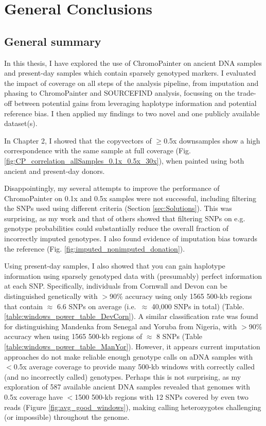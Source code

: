 \chapter{General Conclusions}
\label{chapterlabelConclusions}

\section{General summary}

In this thesis, I have explored the use of ChromoPainter on ancient DNA samples and present-day samples which contain sparsely genotyped markers. I evaluated the impact of coverage on all steps of the analysis pipeline, from imputation and phasing to ChromoPainter and SOURCEFIND analysis, focussing on the trade-off between potential gains from leveraging haplotype information and potential reference bias. I then applied my findings to two novel and one publicly available dataset(s). 

In Chapter 2, I showed that the copyvectors of $\geq$0.5x downsamples show a high correspondence with the same sample at full coverage (Fig. \ref{fig:CP_correlation_allSamples_0.1x_0.5x_30x}), when painted using both ancient and present-day donors. 

Disappointingly, my several attempts to improve the performance of ChromoPainter on 0.1x and 0.5x samples were not successful, including filtering the SNPs used using different criteria (Section \ref{sec:Solutions}). This was surprising, as my work and that of others \cite{hui2020evaluating} showed that filtering SNPs on e.g. genotype probabilities could substantially reduce the overall fraction of incorrectly imputed genotypes. I also found evidence of imputation bias towards the reference (Fig. \ref{fig:imputed_nonimputed_donation}).

Using present-day samples, I also showed that you can gain haplotype information using sparsely genotyped data with (presumably) perfect information at each SNP. Specifically, individuals from Cornwall and Devon can be distinguished genetically with $>$90\% accuracy using only 1565 500-kb regions that contain $\approx$ 6.6 SNPs on average (i.e.\ $\approx$ 40,000 SNPs in total) (Table. \ref{table:windows_power_table_DevCorn}). A similar classification rate was found for distinguishing Mandenka from Senegal and Yoruba from Nigeria, with $>$90\% accuracy when using 1565 500-kb regions of $\approx$ 8 SNPs (Table \ref{table:windows_power_table_ManYor}). However, it appears current imputation approaches do not make reliable enough genotype calls on aDNA samples with $<$0.5x average coverage to provide many 500-kb windows with correctly called (and no incorrectly called) genotypes. Perhaps this is not surprising, as my exploration of 587 available ancient DNA samples revealed that genomes with 0.5x coverage have $<$1500 500-kb regions with 12 SNPs covered by even two reads (Figure \ref{fig:avg_good_windows}), making calling heterozygotes challenging (or impossible) throughout the genome.

